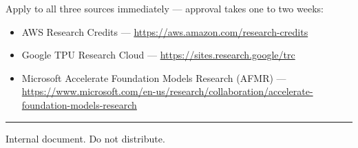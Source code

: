 \documentclass[11pt,letterpaper]{article}
\begin{document}
Apply to all three sources immediately --- approval takes one to two weeks:

\begin{itemize}[nosep]
  \item AWS Research Credits ---
    \url{https://aws.amazon.com/research-credits}
  \item Google TPU Research Cloud ---
    \url{https://sites.research.google/trc}
  \item Microsoft Accelerate Foundation Models Research (AFMR) ---
    {\small\url{https://www.microsoft.com/en-us/research/collaboration/accelerate-foundation-models-research}}
\end{itemize}

\vspace{10pt}
\hrule
{\small\color{gray} Internal document. Do not distribute.}
\end{document}
